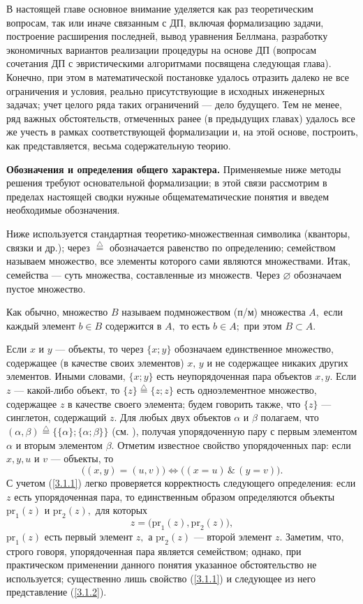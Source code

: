 \documentclass[11pt,twoside,openany]{report}
\newcommand{\bfn}{\begin{equation}}
\newcommand{\efn}{\end{equation}}
\newcommand{\df}{\stackrel{\triangle}{=}}
\newcommand{\al}{\alpha}
\newcommand{\su}{\subset}
\newcommand{\emp}{\varnothing}
\begin{document}
В настоящей главе основное внимание уделяется как раз теоретическим вопросам, так или
иначе связанным с ДП, включая формализацию задачи, построение расширения последней,
вывод уравнения Беллмана, разработку экономичных вариантов реализации процедуры на
основе ДП (вопросам сочетания ДП с эвристическими алгоритмами посвящена следующая глава).
Конечно, при этом в математической постановке удалось отразить далеко не все ограничения
и условия, реально присутствующие в исходных инженерных задачах; учет целого ряда таких
ограничений --- дело будущего. Тем не менее, ряд важных обстоятельств, отмеченных ранее
(в предыдущих главах) удалось все же учесть в рамках соответствующей  формализации и, на
этой основе, построить, как представляется, весьма содержательную теорию.

{\bf Обозначения и определения общего характера.}
Применяемые ниже методы решения требуют основательной формализации; в  этой связи
рассмотрим в пределах настоящей сводки нужные общематематические понятия и введем
необходимые обозначения.

Ниже используется стандартная теоретико-множественная символика (кванторы, связки и
др.);  через $\df$ обозначается равенство по определению; семейством называем множество,
все элементы которого сами являются множествами. Итак, семейства --- суть множества,
составленные из множеств. Через $\emp$ обозначаем пустое множество.

Как обычно, множество $B$ называем подмножеством (п/м) множества $A,$ если каждый
элемент $b\in B$ содержится в $A,$ то есть $b\in A;$ при этом $B\su A.$

Если $x$ и $y$ --- объекты, то через $\{x;y\}$ обозначаем единственное множество,
содержащее (в качестве своих элементов) $x,\,y$  и не содержащее никаких других
элементов. Иными словами, $\{x;y\}$ есть неупорядоченная пара объектов $x, y.$ Если
$z$ --- какой-либо объект, то $\{z\} \df \{z;z\}$ есть одноэлементное множество,
содержащее $z$ в качестве своего элемента; будем говорить также, что $\{z\}$ ---
синглетон, содержащий $z.$
Для любых двух объектов $\al$ и $\beta$ полагаем, что $(\al,\beta) \df
\bigl\{\{\al\};\{\al;\beta\}\bigl\}$ (см. \cite[c. 67]{Cha6`}), получая
упорядоченную пару с первым элементом $\al$ и вторым элементом $\beta.$
Отметим известное свойство упорядоченных пар: если $x, y, u$ и $v$ ---
объекты, то \cite[c. 67]{Cha6`}
\bfn\label{3.1.1}\bigl((x,y) = (u,v)\bigl) \Longleftrightarrow
\bigl((x = u)\,\&\,(y = v)\bigl).
\efn
С учетом (\ref{3.1.1}) легко проверяется корректность следующего определения:
если $z$ есть упорядоченная пара, то единственным образом  определяются объекты
$\mathrm{pr}_1(z)$ и $\mathrm{pr}_2(z),$ для которых
\bfn\label{3.1.2}z = \bigl(\mathrm{pr}_1(z),\mathrm{pr}_2(z)\bigl),
\efn
$\mathrm{pr}_1(z)$ есть первый элемент $z,$ а $\mathrm{pr}_2(z)$ --- второй элемент
$z.$ Заметим, что, строго говоря, упорядоченная пара является семейством; однако,
при практическом применении данного понятия указанное обстоятельство не используется;
существенно лишь свойство (\ref{3.1.1}) и следующее из него представление (\ref{3.1.2}).
\end{document}
